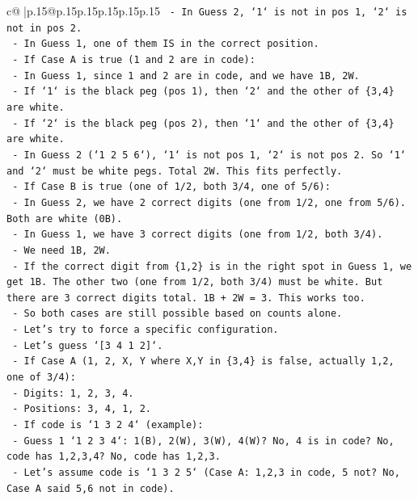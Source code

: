 \documentclass{article}
\begin{document}
{\begin{supertabular}{c@{$\;$}|p{.15\linewidth}@{}p{.15\linewidth}p{.15\linewidth}p{.15\linewidth}p{.15\linewidth}p{.15\linewidth}}
{{{\texttt{    {-} In Guess 2, `1` is not in pos 1, `2` is not in pos 2.} \\
\texttt{    {-} In Guess 1, one of them IS in the correct position.} \\
\texttt{    {-} If Case A is true (1 and 2 are in code):} \\
\texttt{        {-} In Guess 1, since 1 and 2 are in code, and we have 1B, 2W.} \\
\texttt{        {-} If `1` is the black peg (pos 1), then `2` and the other of \{3,4\} are white.} \\
\texttt{        {-} If `2` is the black peg (pos 2), then `1` and the other of \{3,4\} are white.} \\
\texttt{        {-} In Guess 2 (`1 2 5 6`), `1` is not pos 1, `2` is not pos 2. So `1` and `2` must be white pegs. Total 2W. This fits perfectly.} \\
\texttt{    {-} If Case B is true (one of 1/2, both 3/4, one of 5/6):} \\
\texttt{        {-} In Guess 2, we have 2 correct digits (one from 1/2, one from 5/6). Both are white (0B).} \\
\texttt{        {-} In Guess 1, we have 3 correct digits (one from 1/2, both 3/4).} \\
\texttt{        {-} We need 1B, 2W.} \\
\texttt{        {-} If the correct digit from \{1,2\} is in the right spot in Guess 1, we get 1B. The other two (one from 1/2, both 3/4) must be white. But there are 3 correct digits total. 1B + 2W = 3. This works too.} \\
\texttt{    {-} So both cases are still possible based on counts alone.} \\
\texttt{    {-} Let's try to force a specific configuration.} \\
\texttt{    {-} Let's guess `{[}3 4 1 2{]}`.} \\
\texttt{    {-} If Case A (1, 2, X, Y where X,Y in \{3,4\} is false, actually 1,2, one of 3/4):} \\
\texttt{        {-} Digits: 1, 2, 3, 4.} \\
\texttt{        {-} Positions: 3, 4, 1, 2.} \\
\texttt{        {-} If code is `1 3 2 4` (example):} \\
\texttt{            {-} Guess 1 `1 2 3 4`: 1(B), 2(W), 3(W), 4(W)? No, 4 is in code? No, code has 1,2,3,4? No, code has 1,2,3.} \\
\texttt{            {-} Let's assume code is `1 3 2 5` (Case A: 1,2,3 in code, 5 not? No, Case A said 5,6 not in code).} \\
}}}
\end{supertabular}}
\end{document}
